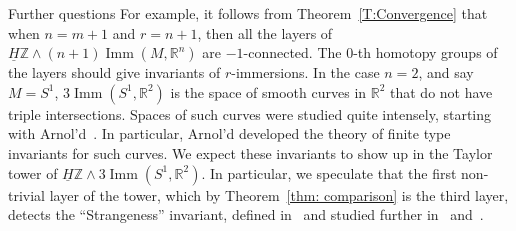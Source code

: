 \documentclass[12pt]{amsart}
\newcommand{\R}{{\mathbb R}}
\newcommand{\Z}{{\mathbb Z}}
\newcommand{\Imm}{\operatorname{Imm}}
\newcommand{\HZ}{\underline{H}\Z}
\theoremstyle{plain}
\theoremstyle{definition}
\theoremstyle{remark}
\begin{document}
\begin{section}{Further questions}
For example, it follows from Theorem~\ref{T:Convergence} that when $n=m+1$ and $r=n+1$, then all the layers of $\HZ\wedge (n+1)\Imm(M, \R^n)$ are $-1$-connected. The $0$-th homotopy groups of the layers should give invariants of $r$-immersions. In the case $n=2$, and say $M=S^1$, $3\Imm(S^1, \R^2)$ is the space of smooth curves in $\R^2$ that do not have triple intersections. Spaces of such curves were studied quite intensely, starting with Arno{l'}d~\cite{Arnold:PlaneCurves, Tabachnikov:PlaneCurves, Shumakovich:Formulas}. In particular, Arno{l'}d developed the theory of finite type invariants for such curves. We expect these invariants to show up in the Taylor tower of  $\HZ\wedge 3\Imm(S^1, \R^2)$. In particular, we speculate that the first non-trivial layer of the tower, which by Theorem~\ref{thm: comparison} is the third layer, detects the ``Strangeness'' invariant, defined in~\cite{Arnold:PlaneCurves} and studied further in~\cite{Tabachnikov:PlaneCurves} and~\cite{Shumakovich:Formulas}.
\end{section}


\vspace*{0.5cm}

%



%
\end{document}
